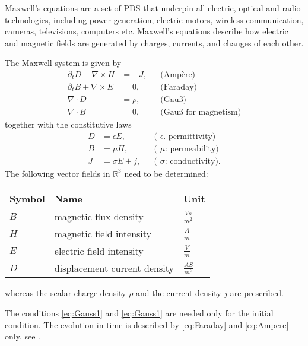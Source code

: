 \documentclass[a4paper,12pt]{article}
\theoremstyle{definition}
\theoremstyle{definition}
\begin{document}
Maxwell's equations are a set of PDS that underpin all electric, optical and radio technologies, including power generation, electric motors, wireless communication, cameras, televisions, computers etc. Maxwell's equations describe how electric and magnetic fields are generated by charges, currents, and changes of each other. 

The Maxwell system is given by
\begin{subequations}
	\begin{align}
	\partial_t D - \nabla\times H &= -J, &&\text{(Ampère)} \label{eq:Ampere}\\
	\partial_t B + \nabla\times E &= 0, &&\text{(Faraday)} \label{eq:Faraday}\\
	\nabla\cdot D &= \rho, &&\text{(Gauß)} \label{eq:Gauss1}\\
	\nabla\cdot B &=0, &&\text{(Gauß for magnetism)} \label{eq:Gauss2}
	\end{align}
\end{subequations}
together with the constitutive laws
\begin{subequations}
	\begin{align}
	D &= \epsilon E, &&\text{( $\epsilon$. permittivity)}\\
	B &= \mu H, &&\text{( $\mu$: permeability)}\\
	J &= \sigma E + j, &&\text{( $\sigma$: conductivity)} .
	\end{align}
\end{subequations}
The following vector fields in $\mathbb{R}^3$ need to be determined:
\begin{center}
	\begin{tabular}{lll}
		Symbol & Name & Unit\\
		\hline
		$B$ & magnetic flux density & $\frac{Vs}{m^2}$\\
		$H$ & magnetic field intensity & $\frac{A}{m}$\\
		$E$ & electric field intensity & $\frac{V}{m}$\\
		$D$ & displacement current density & $\frac{AS}{m^2}$\\
		\hline
	\end{tabular}
\end{center}
whereas the scalar charge density $\rho$ and the current density $j$ are prescribed.

The conditions \eqref{eq:Gauss1} and \eqref{eq:Gauss1} are needed only for the
initial condition. The evolution in time is described by \eqref{eq:Faraday} and
\eqref{eq:Ampere} only, see \cite{JinBook}.
\end{document}
